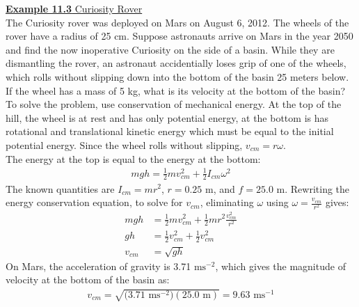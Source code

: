 \documentclass[a4paper]{article}
\let\bf\textbf
\newcommand\m{\text{ m}}
\newcommand\ms{\text{ ms}^{-1}}
\newcommand\mss{\text{ ms}^{-2}}
\begin{document}
\begin{shaded}
    \underline{\bf{Example 11.3} Curiosity Rover}
    \vspace{2mm}\\
    The Curiosity rover was deployed on Mars on August 6, 2012. The wheels of the rover have a radius of 25 cm. Suppose astronauts arrive on Mars in the year 2050 and find the now inoperative Curiosity on the side of a basin. While they are dismantling the rover, an astronaut accidentially loses grip of one of the wheels, which rolls without slipping down into the bottom of the basin 25 meters below. If the wheel has a mass of 5 kg, what is its velocity at the bottom of the basin?\vspace{1mm}\\
    To solve the problem, use conservation of mechanical energy. At the top of the hill, the wheel is at rest and has only potential energy, at the bottom is has rotational and translational kinetic energy which must be equal to the initial potential energy. Since the wheel rolls without slipping, $v_{cm} = r\omega$.
    \vspace{1mm}\\
    The energy at the top is equal to the energy at the bottom:
    \begin{align*}
        mgh = \frac{1}{2}mv_{cm}^2 + \frac{1}{2}I_{cm}\omega^2
    \end{align*}
    The known quantities are $I_{cm} = mr^2$, $r = 0.25$ m, and $f = 25.0$ m. Rewriting the energy conservation equation, to solve for $v_{cm}$, eliminating $\omega$ using $\omega = \frac{v_{cm}}{r^2}$ gives:
    \begin{align*}
        mgh &= \frac{1}{2}mv_{cm}^2 + \frac{1}{2}mr^2\frac{v_{cm}^2}{r^2}\\
        gh &= \frac{1}{2}v_{cm}^2 + \frac{1}{2}v_{cm}^2\\
        v_{cm} &= \sqrt{gh}
    \end{align*}
    On Mars, the acceleration of gravity is 3.71$\mss$, which gives the magnitude of velocity at the bottom of the basin as:
    \begin{align*}
        v_{cm} = \sqrt{\big(3.71\mss\big)(25.0\m)} = 9.63\ms
    \end{align*}
\end{shaded}
\newpage
\end{document}
